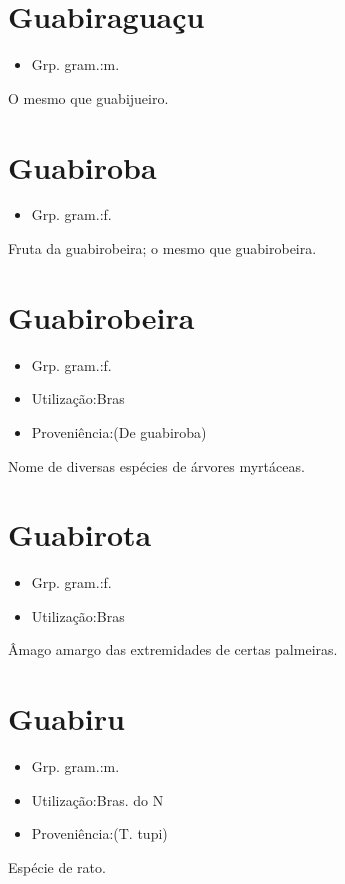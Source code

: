 \section{Guabiraguaçu}
\begin{itemize}
\item {Grp. gram.:m.}
\end{itemize}
O mesmo que \textunderscore guabijueiro\textunderscore .
\section{Guabiroba}
\begin{itemize}
\item {Grp. gram.:f.}
\end{itemize}
Fruta da guabirobeira; o mesmo que \textunderscore guabirobeira\textunderscore .
\section{Guabirobeira}
\begin{itemize}
\item {Grp. gram.:f.}
\end{itemize}
\begin{itemize}
\item {Utilização:Bras}
\end{itemize}
\begin{itemize}
\item {Proveniência:(De \textunderscore guabiroba\textunderscore )}
\end{itemize}
Nome de diversas espécies de árvores myrtáceas.
\section{Guabirota}
\begin{itemize}
\item {Grp. gram.:f.}
\end{itemize}
\begin{itemize}
\item {Utilização:Bras}
\end{itemize}
Âmago amargo das extremidades de certas palmeiras.
\section{Guabiru}
\begin{itemize}
\item {Grp. gram.:m.}
\end{itemize}
\begin{itemize}
\item {Utilização:Bras. do N}
\end{itemize}
\begin{itemize}
\item {Proveniência:(T. tupi)}
\end{itemize}
Espécie de rato.
